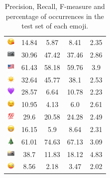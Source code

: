 \documentclass{article}
\begin{document}
\begin{table}
\begin{tabular}{|c|ccc|c|}
\includegraphics[height=0.37cm,width=0.37cm]{img/face_blowing_a_kiss.png} & 14.84 & 5.87 & 8.41 & 2.35\\ 
\includegraphics[height=0.37cm,width=0.37cm]{img/camera.png} & 30.96 & 47.42 & 37.46 & 2.86\\ 
\includegraphics[height=0.37cm,width=0.37cm]{img/United_States.png} & 61.43 & 58.18 & 59.76 & 3.9\\ 
\includegraphics[height=0.37cm,width=0.37cm]{img/sun.png} & 32.64 & 45.77 & 38.1 & 2.53\\ 
\includegraphics[height=0.37cm,width=0.37cm]{img/purple_heart.png} & 28.57 & 6.64 & 10.78 & 2.23\\ 
\includegraphics[height=0.37cm,width=0.37cm]{img/winking_face.png} & 10.95 & 4.13 & 6.0 & 2.61\\ 
\includegraphics[height=0.37cm,width=0.37cm]{img/hundred_points.png} & 29.6 & 20.58 & 24.28 & 2.49\\ 
\includegraphics[height=0.37cm,width=0.37cm]{img/beaming_face_with_smiling_eyes.png} & 16.15 & 5.9 & 8.64 & 2.31\\ 
\includegraphics[height=0.37cm,width=0.37cm]{img/Christmas_tree.png} & 61.01 & 74.63 & 67.13 & 3.09\\ 
\includegraphics[height=0.37cm,width=0.37cm]{img/camera_with_flash.png} & 38.7 & 11.83 & 18.12 & 4.83\\ 
\includegraphics[height=0.37cm,width=0.37cm]{img/winking_face_with_tongue.png} & 8.56 & 2.18 & 3.47 & 2.02\\ 

\hline
\end{tabular}
\caption{\label{table:emoji_detailed} Precision, Recall, F-measure and percentage of occurrences in the test set of each emoji.}
\end{table}
\end{document}
